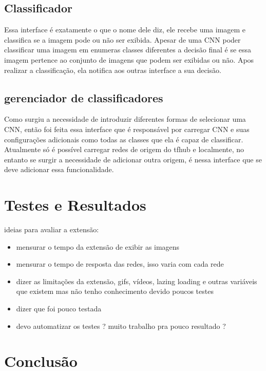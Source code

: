 \documentclass[conference]{IEEEtran}
\begin{document}
\subsection{Classificador}
Essa interface é exatamente o que o nome dele diz, ele recebe uma imagem e classifica se a imagem pode ou não ser exibida. Apesar de uma CNN poder classificar uma imagem em enumeras classes diferentes a decisão final é se essa imagem pertence ao conjunto de imagens que podem ser exibidas ou não. Apos realizar a classificação, ela notifica aos outras interface a sua decisão.  

\subsection{gerenciador de classificadores}
Como surgiu a necessidade de introduzir diferentes formas de selecionar uma CNN, então foi feita essa interface que é responsável por carregar CNN e suas configurações adicionais como todas as classes que ela é capaz de classificar. Atualmente só é possível carregar redes de origem do tfhub e localmente, no entanto se surgir a necessidade de adicionar outra origem, é nessa interface que se deve adicionar essa funcionalidade.


\section{Testes e Resultados}\label{testsAndResults} 
ideias para avaliar a extensão:
\begin{itemize}
	\item mensurar o tempo da extensão de exibir as imagens 
	\item mensurar o tempo de resposta das redes, isso varia com cada rede
	\item dizer as limitações da extensão, gifs, vídeos, lazing loading e outras variáveis que existem mas não tenho conhecimento devido poucos testes
	\item dizer que foi pouco testada
	\item devo automatizar os testes ? muito trabalho pra pouco resultado ?  
\end{itemize}

\section{Conclusão}\label{conclusion} 








\end{document}

